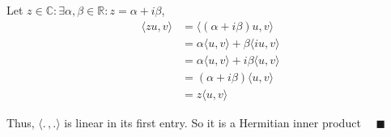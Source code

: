 \documentclass{article}
\newcommand\R{\mathbb{R}}
\newcommand\C{\mathbb{C}}
\begin{document}
Let $z\in \C:\exists \alpha,\beta\in\R: z= \alpha +i\beta$,
\begin{align*}
  \langle zu,v \rangle &= \langle (\alpha+i\beta) u,v \rangle\\
                       &= \alpha \langle u,v \rangle + \beta \langle iu,v \rangle\\
                       &= \alpha \langle u,v \rangle + i\beta \langle
                         u,v \rangle\\
                       &= (\alpha+ i\beta) \langle u,v \rangle\\
                       &=z\langle u,v \rangle
\end{align*}

Thus, $\langle .\,,. \rangle$ is linear in its first entry. So it is a
Hermitian  inner product $\quad \blacksquare$
\end{document}
